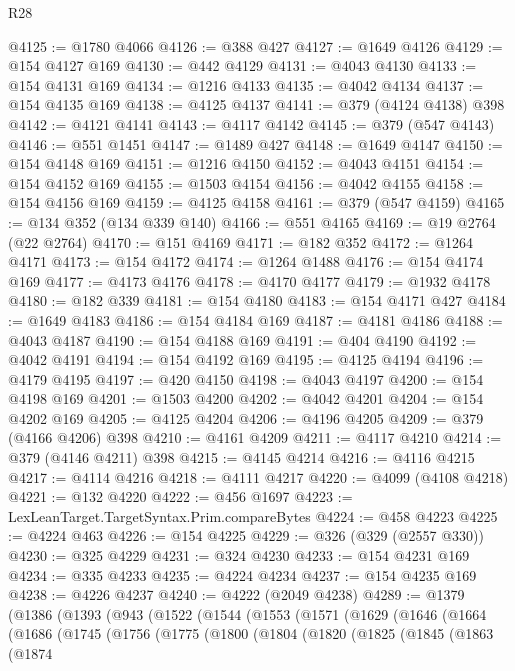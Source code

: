 \begin{lexlean}{R28}
\begin{coremodule}
@4125 := @1780 @4066
@4126 := @388 @427
@4127 := @1649 @4126
@4129 := @154 @4127 @169
@4130 := @442 @4129
@4131 := @4043 @4130
@4133 := @154 @4131 @169
@4134 := @1216 @4133
@4135 := @4042 @4134
@4137 := @154 @4135 @169
@4138 := @4125 @4137
@4141 := @379 (@4124 @4138) @398
@4142 := @4121 @4141
@4143 := @4117 @4142
@4145 := @379 (@547 @4143)
@4146 := @551 @1451
@4147 := @1489 @427
@4148 := @1649 @4147
@4150 := @154 @4148 @169
@4151 := @1216 @4150
@4152 := @4043 @4151
@4154 := @154 @4152 @169
@4155 := @1503 @4154
@4156 := @4042 @4155
@4158 := @154 @4156 @169
@4159 := @4125 @4158
@4161 := @379 (@547 @4159)
@4165 := @134 @352 (@134 @339 @140)
@4166 := @551 @4165
@4169 := @19 @2764 (@22 @2764)
@4170 := @151 @4169
@4171 := @182 @352
@4172 := @1264 @4171
@4173 := @154 @4172
@4174 := @1264 @1488
@4176 := @154 @4174 @169
@4177 := @4173 @4176
@4178 := @4170 @4177
@4179 := @1932 @4178
@4180 := @182 @339
@4181 := @154 @4180
@4183 := @154 @4171 @427
@4184 := @1649 @4183
@4186 := @154 @4184 @169
@4187 := @4181 @4186
@4188 := @4043 @4187
@4190 := @154 @4188 @169
@4191 := @404 @4190
@4192 := @4042 @4191
@4194 := @154 @4192 @169
@4195 := @4125 @4194
@4196 := @4179 @4195
@4197 := @420 @4150
@4198 := @4043 @4197
@4200 := @154 @4198 @169
@4201 := @1503 @4200
@4202 := @4042 @4201
@4204 := @154 @4202 @169
@4205 := @4125 @4204
@4206 := @4196 @4205
@4209 := @379 (@4166 @4206) @398
@4210 := @4161 @4209
@4211 := @4117 @4210
@4214 := @379 (@4146 @4211) @398
@4215 := @4145 @4214
@4216 := @4116 @4215
@4217 := @4114 @4216
@4218 := @4111 @4217
@4220 := @4099 (@4108 @4218)
@4221 := @132 @4220
@4222 := @456 @1697
@4223 := LexLeanTarget.TargetSyntax.Prim.compareBytes
@4224 := @458 @4223
@4225 := @4224 @463
@4226 := @154 @4225
@4229 := @326 (@329 (@2557 @330))
@4230 := @325 @4229
@4231 := @324 @4230
@4233 := @154 @4231 @169
@4234 := @335 @4233
@4235 := @4224 @4234
@4237 := @154 @4235 @169
@4238 := @4226 @4237
@4240 := @4222 (@2049 @4238)
@4289 := @1379
    (@1386
      (@1393
        (@943
          (@1522
            (@1544
              (@1553
                (@1571
                  (@1629
                    (@1646
                      (@1664
                        (@1686
                          (@1745
                            (@1756
                              (@1775
                                (@1800
                                  (@1804
                                    (@1820
                                      (@1825
                                        (@1845
                                          (@1863
                                            (@1874

\end{coremodule}
\end{lexlean}

